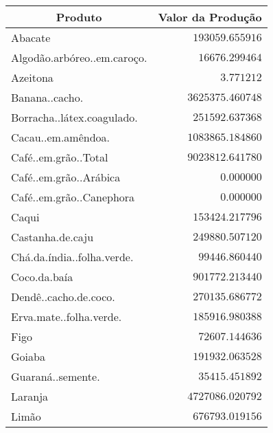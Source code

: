 \begin{table}[!tbp]
\begin{center}
\begin{tabular}{lr}
\hline\hline
\multicolumn{1}{c}{Produto}&\multicolumn{1}{c}{Valor da Produção}\tabularnewline
\hline
Abacate&$ 193059.655916$\tabularnewline
Algodão.arbóreo..em.caroço.&$  16676.299464$\tabularnewline
Azeitona&$      3.771212$\tabularnewline
Banana..cacho.&$3625375.460748$\tabularnewline
Borracha..látex.coagulado.&$ 251592.637368$\tabularnewline
Cacau..em.amêndoa.&$1083865.184860$\tabularnewline
Café..em.grão..Total&$9023812.641780$\tabularnewline
Café..em.grão..Arábica&$      0.000000$\tabularnewline
Café..em.grão..Canephora&$      0.000000$\tabularnewline
Caqui&$ 153424.217796$\tabularnewline
Castanha.de.caju&$ 249880.507120$\tabularnewline
Chá.da.índia..folha.verde.&$  99446.860440$\tabularnewline
Coco.da.baía&$ 901772.213440$\tabularnewline
Dendê..cacho.de.coco.&$ 270135.686772$\tabularnewline
Erva.mate..folha.verde.&$ 185916.980388$\tabularnewline
Figo&$  72607.144636$\tabularnewline
Goiaba&$ 191932.063528$\tabularnewline
Guaraná..semente.&$  35415.451892$\tabularnewline
Laranja&$4727086.020792$\tabularnewline
Limão&$ 676793.019156$\tabularnewline
\hline
\end{tabular}\end{center}

\end{table}
